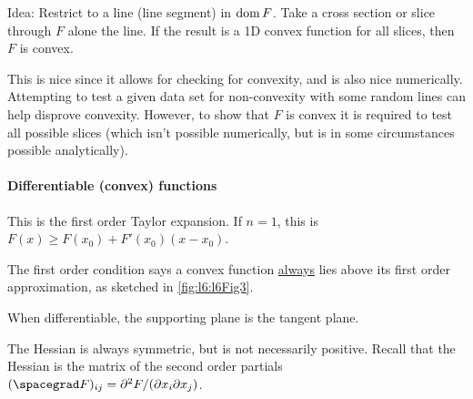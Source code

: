 Idea: Restrict to a line (line segment) in \( \operatorname{dom} F \).  Take a cross section or slice through \( F \) alone the line.  If the result is a 1D convex function for all slices, then \( F \) is convex.

This is nice since it allows for checking for convexity, and is also nice numerically.  Attempting to test a given data set for non-convexity with some random lines can help disprove convexity.   However, to show that \( F \) is convex it is required to test all possible slices (which isn't possible numerically, but is in some circumstances possible analytically).

\paragraph{Differentiable (convex) functions}


This is the first order Taylor expansion.  If \( n = 1 \), this is \( F(x) \ge F(x_0) + F'(x_0) ( x - x_0) \).

The first order condition says a convex function \underline{always} lies above its first order approximation, as sketched in
\cref{fig:l6:l6Fig3}.

When differentiable, the supporting plane is the tangent plane.


The Hessian is always symmetric, but is not necessarily positive.  Recall that the Hessian is the matrix of the second order partials \( (\spacegrad F)_{ij} = \partial^2 F/(\partial x_i \partial x_j) \).

